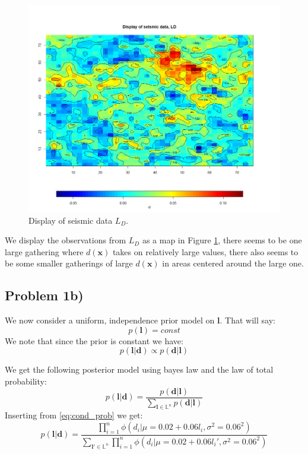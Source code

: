 \documentclass{article}
\newcommand{\vect}[1]{\ensuremath{\boldsymbol{\mathbf{#1}}}}
\begin{document}
	 \begin{figure}[H]	
	 	\begin{center} 
	 		\includegraphics[scale=0.45]{figure1.png}
	 	\end{center}
	 	\caption{Display of seismic data $L_D$.}
	 	\label{fig:1a1} 
	\end{figure}
	 
	 
	 We display the observations from $L_D$ as a map in Figure \ref{fig:1a1}, there seems to be one large gathering where $d(\vect x)$ takes on relatively large values, there also seems to be some smaller gatherings of large $d(\vect x)$ in areas centered around the large one.  

	\newpage
	\subsection*{Problem 1b)}
	We now consider a uniform, independence prior model on $\vect l$. That will say: 
	\begin{equation}
		p(\vect l) = const
	\end{equation}
	We note that since the prior is constant we have:
	\begin{equation}
		p(\vect l | \vect d) \propto p(\vect d | \vect l)
	\end{equation}

	We get the following posterior model using bayes law and the law of total probability: 
	\begin{equation}
		p(\vect l | \vect d) = \dfrac{p(\vect d | \vect l)}{\sum_{\vect l \in \mathbb{L}^n}p(\vect d | \vect l)}
	\end{equation}
	Inserting from \eqref{eq:cond_prob} we get:
	\begin{equation}
		p(\vect l | \vect d) = \dfrac{ \prod_{i=1}^{n}  \phi(d_i |\mu = 0.02 + 0.06l_i, \sigma^2 = 0.06^2)}{\sum_{\vect l' \in \mathbb{L}^n} \prod_{i=1}^{n}  \phi(d_i |\mu = 0.02 + 0.06l_i', \sigma^2 = 0.06^2)}
	\end{equation}
	
\end{document}
